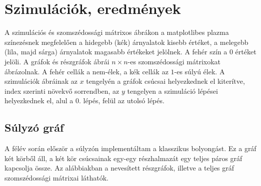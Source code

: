 \chapter{Szimulációk, eredmények}

A szimulációs és szomszédossági mátrixos ábrákon a matplotlibes plazma
színezésnek megfelelően a hidegebb (kék) árnyalatok kisebb értéket, a melegebb
(lila, majd sárga) árnyalatok magasabb értékeket jelölnek. A fehér szín a 0
értéket jelöli. A gráfok és részgráfok ábrái $n \times n$-es szomszédossági
mátrixokat ábrázolnak. A fehér cellák a nem-élek, a kék cellák az $1$-es súlyú
élek. A szimulációk ábráinak az $x$ tengelyén a gráfok csúcsai helyezkednek el
kiterítve, index szerinti növekvő sorrendben, az $y$ tengelyen a szimuláció
lépései helyezkednek el, alul a $0.$ lépés, felül az utolsó lépés.

\section{Súlyzó gráf}

A félév során először a súlyzón implementáltam a klasszikus bolyongást. Ez a
gráf két körből áll, a két kör csúcsainak egy-egy részhalmazát egy teljes páros
gráf kapcsolja össze. Az alábbiakban a nevesített részgráfok, illetve a teljes
gráf szomszédossági mátrixai láthatók.


